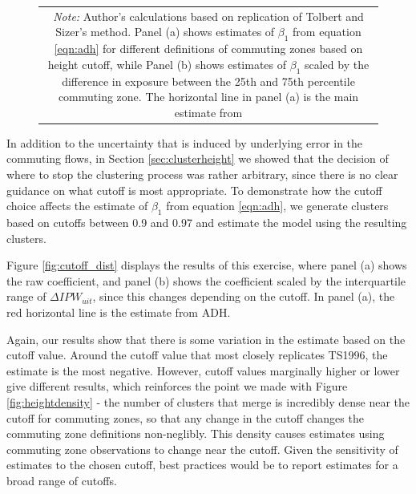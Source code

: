\begin{figure}
\begin{tabular}{cc}
\multicolumn{2}{p{6.5in}}{\footnotesize \emph{Note:} Author's calculations based on replication of Tolbert and Sizer's method. Panel (a) shows estimates of $\beta_1$ from equation \ref{eqn:adh} for different definitions of commuting zones based on height cutoff, while Panel (b) shows estimates of $\beta_1$ scaled by the difference in exposure between the 25th and 75th percentile commuting zone. The horizontal line in panel (a) is the main estimate from \citet{ADH2013}}
\end{tabular}
\end{figure}

In addition to the uncertainty that is induced by underlying error in the commuting flows, in Section \ref{sec:clusterheight} we showed that the decision of where to stop the clustering process was rather arbitrary, since there is no clear guidance on what cutoff is most appropriate. To demonstrate how the cutoff choice affects the estimate of $\beta_1$ from equation \ref{eqn:adh}, we generate clusters based on cutoffs between 0.9 and 0.97 and estimate the model using the resulting clusters.

Figure \ref{fig:cutoff_dist} displays the results of this exercise, where panel (a) shows the raw coefficient, and panel (b) shows the coefficient scaled by the interquartile range of $\Delta IPW_{uit}$, since this changes depending on the cutoff. In panel (a), the red horizontal line is the estimate from ADH.

Again, our results show that there is some variation in the estimate based on the cutoff value. Around the cutoff value that most closely replicates TS1996, the estimate is the most negative. However, cutoff values marginally higher or lower give different results, which reinforces the point we made with Figure \ref{fig:heightdensity} - the number of clusters that merge is incredibly dense near the cutoff for commuting zones, so that any change in the cutoff changes the commuting zone definitions non-neglibly. This density causes estimates using commuting zone observations to change near the cutoff. Given the sensitivity of estimates to the chosen cutoff, best practices would be to report estimates for a broad range of cutoffs.
